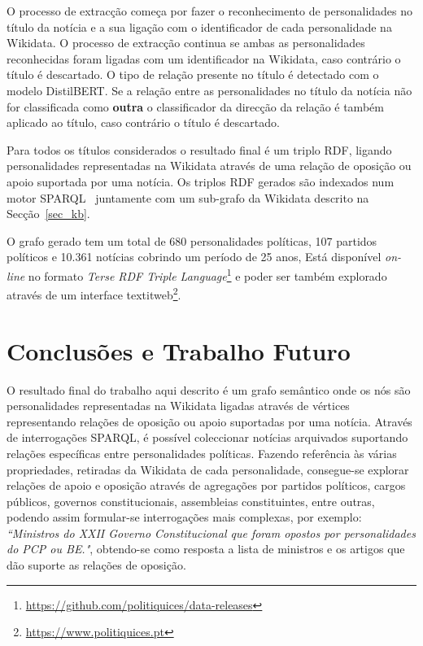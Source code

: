 \documentclass[a4paper, twocolumn, 11pt, twoside]{article}
\begin{document}
O processo de extracção começa por fazer o reconhecimento de personalidades no título da notícia e a sua ligação com o identificador de cada personalidade na Wikidata. O processo de extracção continua se ambas as personalidades reconhecidas foram ligadas com um identificador na Wikidata, caso contrário o título é descartado. O tipo de relação presente no título é detectado com o modelo DistilBERT. Se a relação entre as personalidades no título da notícia não for classificada como \textbf{outra} o classificador da direcção da relação é também aplicado ao título, caso contrário o título é descartado.

Para todos os títulos considerados o resultado final é um triplo RDF, ligando personalidades representadas na Wikidata através de uma relação de oposição ou apoio suportada por uma notícia. Os triplos RDF gerados são indexados num motor SPARQL~\citep{jena2015free} juntamente com um sub-grafo da Wikidata descrito na Secção~\ref{sec_kb}.

O grafo gerado tem um total de 680 personalidades políticas, 107 partidos políticos e 10.361 notícias cobrindo um período de 25 anos, Está disponível \textit{on-line} no formato \textit{Terse RDF Triple Language}\footnote{\url{https://github.com/politiquices/data-releases}} e poder ser também explorado através de um interface textit{web}\footnote{\url{https://www.politiquices.pt}}.

\section{Conclusões e Trabalho Futuro}
\label{sec:future_work}

O resultado final do trabalho aqui descrito é um grafo semântico onde os nós são personalidades representadas na Wikidata ligadas através de vértices representando relações de oposição ou apoio suportadas por uma notícia. Através de interrogações SPARQL, é possível coleccionar notícias arquivados suportando relações específicas entre personalidades políticas. Fazendo referência às várias propriedades, retiradas da Wikidata de cada personalidade, consegue-se explorar relações de apoio e oposição através de agregações por partidos políticos, cargos públicos, governos constitucionais, assembleias constituintes, entre outras, podendo assim formular-se interrogações mais complexas, por exemplo: \textit{``Ministros do XXII Governo Constitucional que foram opostos por personalidades do PCP ou BE."}, obtendo-se como resposta a lista de ministros e os artigos que dão suporte as relações de oposição.
\end{document}
